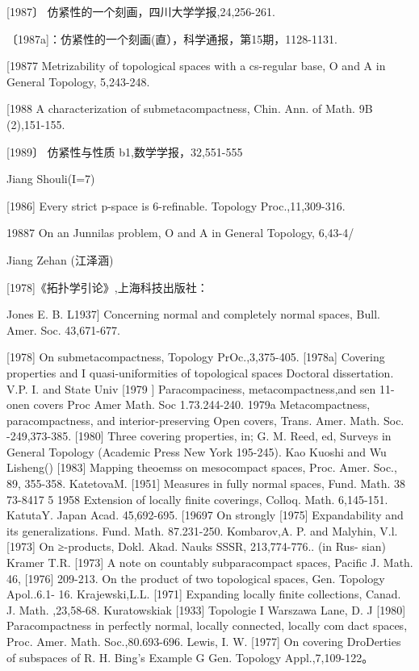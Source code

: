 \documentclass[main.tex]{subfiles}
\begin{document}
[1987〕 仿紧性的一个刻画，四川大学学报,24,256-261.

〔1987a]：仿紧性的一个刻画(直），科学通报，第15期，1128-1131.

[19877 Metrizability of topological spaces with a cs-regular base, O and A
in General Topology, 5,243-248.

[1988 A characterization of submetacompactness, Chin. Ann. of Math. 9B
(2),151-155.

[1989〕 仿紧性与性质 b1,数学学报，32,551-555

\noindent Jiang Shouli(I=7)

[1986] Every strict p-space is 6-refinable. Topology Proc.,11,309-316.

19887 On an Junnilas problem, O and A in General Topology, 6,43-4/

Jiang Zehan (江泽涵)

[1978]《拓扑学引论》,上海科技出版社：

\noindent Jones E. B.
L1937] Concerning normal and completely normal spaces, Bull. Amer. Soc.
43,671-677.

[1978]
On submetacompactness, Topology PrOc.,3,375-405.
[1978a]
Covering properties and
I quasi-uniformities of topological spaces
Doctoral dissertation. V.P. I. and State Univ
[1979 ]
Paracompaciness,
metacompactness,and
sen
11-onen
covers
Proc
Amer Math. Soc
1.73.244-240.
1979a Metacompactness, paracompactness, and
interior-preserving Open
covers, Trans. Amer. Math. Soc. -249,373-385.
[1980]
Three covering properties, in; G. M. Reed, ed, Surveys in General
Topology (Academic Press New York 195-245).
Kao Kuoshi and Wu Lisheng()
[1983]
Mapping theoemss on mesocompact spaces, Proc. Amer. Soc., 89,
355-358.
KatetovaM.
[1951]
Measures in fully normal spaces, Fund. Math. 38 73-8417
5 1958 Extension
of locally finite coverings, Colloq. Math. 6,145-151.
KatutaY.
Japan Acad. 45,692-695.
[19697
On strongly
[1975]
Expandability and its generalizations. Fund. Math. 87.231-250.
Kombarov,A. P. and Malyhin, V.l.
[1973] On ≥-products, Dokl. Akad. Nauks SSSR, 213,774-776.. (in Rus-
sian)
Kramer T.R.
[1973]
A note on countably subparacompact spaces, Pacific J. Math. 46,
[1976]
209-213.
On the product of two topological spaces, Gen. Topology Apol..6.1-
16.
Krajewski,L.L.
[1971] Expanding locally finite collections, Canad. J. Math.
,23,58-68.
Kuratowskiak
[1933]
Topologie I Warszawa
Lane, D. J
[1980] Paracompactness in perfectly normal, locally connected, locally com
dact spaces, Proc. Amer. Math. Soc.,80.693-696.
Lewis, I. W.
[1977]
On covering DroDerties of subspaces of R. H. Bing's Example G
Gen. Topology Appl.,7,109-122。
\end{document}
